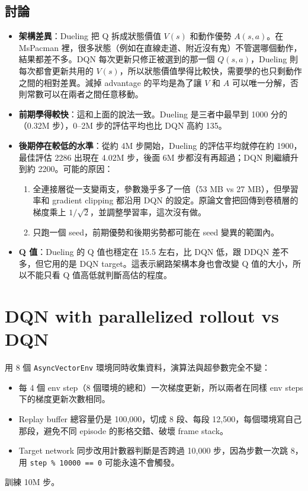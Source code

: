 \documentclass[11pt,a4paper]{article}
\begin{document}
\subsection{討論}
\begin{itemize}
  \item \textbf{架構差異}：Dueling 把 Q 拆成狀態價值 $V(s)$ 和動作優勢 $A(s,a)$。在 MsPacman 裡，很多狀態（例如在直線走道、附近沒有鬼）不管選哪個動作，結果都差不多。DQN 每次更新只修正被選到的那一個 $Q(s,a)$，Dueling 則每次都會更新共用的 $V(s)$，所以狀態價值學得比較快，需要學的也只剩動作之間的相對差異。減掉 advantage 的平均是為了讓 $V$ 和 $A$ 可以唯一分解，否則常數可以在兩者之間任意移動。
  \item \textbf{前期學得較快}：這和上面的說法一致。Dueling 是三者中最早到 1000 分的（0.32M 步），0--2M 步的評估平均也比 DQN 高約 135。
  \item \textbf{後期停在較低的水準}：從約 4M 步開始，Dueling 的評估平均就停在約 1900，最佳評估 2286 出現在 4.02M 步，後面 6M 步都沒有再超過；DQN 則繼續升到約 2200。可能的原因：
  \begin{enumerate}
    \item 全連接層從一支變兩支，參數幾乎多了一倍（53 MB vs 27 MB），但學習率和 gradient clipping 都沿用 DQN 的設定。原論文會把回傳到卷積層的梯度乘上 $1/\sqrt{2}$，並調整學習率，這次沒有做。
    \item 只跑一個 seed，前期優勢和後期劣勢都可能在 seed 變異的範圍內。
  \end{enumerate}
  \item \textbf{Q 值}：Dueling 的 Q 值也穩定在 15.5 左右，比 DQN 低，跟 DDQN 差不多，但它用的是 DQN target。這表示網路架構本身也會改變 Q 值的大小，所以不能只看 Q 值高低就判斷高估的程度。
\end{itemize}

\section{DQN with parallelized rollout vs DQN}

用 8 個 \texttt{AsyncVectorEnv} 環境同時收集資料，演算法與超參數完全不變：
\begin{itemize}
  \item 每 4 個 env step（8 個環境的總和）一次梯度更新，所以兩者在同樣 env steps 下的梯度更新次數相同。
  \item Replay buffer 總容量仍是 100{,}000，切成 8 段、每段 12{,}500，每個環境寫自己那段，避免不同 episode 的影格交錯、破壞 frame stack。
  \item Target network 同步改用計數器判斷是否跨過 10{,}000 步，因為步數一次跳 8，用 \texttt{step \% 10000 == 0} 可能永遠不會觸發。
\end{itemize}
訓練 10M 步。
\end{document}
